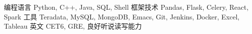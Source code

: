 \documentclass[11pt, a4paper, UTF8]{awesome-cv}
\begin{document}
%
\begin{cvskills}
  \cvskill
    {编程语言} %
    {Python, C++, Java, SQL, Shell} %
  \cvskill
    {框架技术} %
    {Pandas, Flask, Celery, React, Spark} %
  \cvskill
    {工具} %
    {Teradata, MySQL, MongoDB, Emacs, Git, Jenkins, Docker, Excel, Tableau} %
  \cvskill
    {英文} %
    {CET6, GRE, 良好听说读写能力} %
\end{cvskills}



%
%
%
%
%


\end{document}
